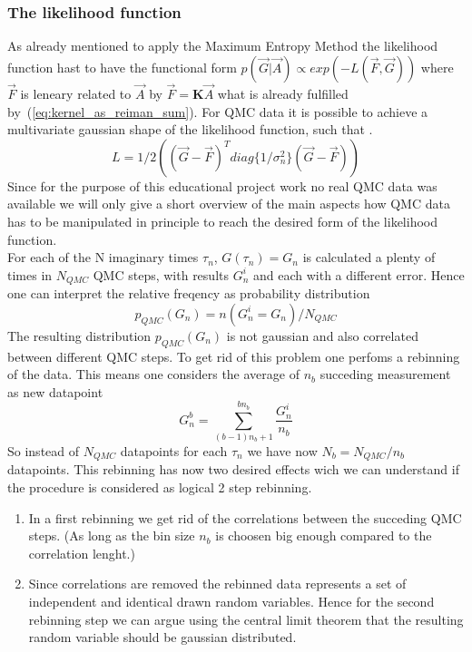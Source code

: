 \subsubsection{The likelihood function}

As already mentioned to apply the Maximum Entropy Method the likelihood function hast to have the functional form 
$ p(\vec{G}|\vec{A}) \propto exp(-L(\vec{F},\vec{G}))$ where $\vec{F}$ is leneary related to $\vec{A}$ by
$\vec{F} = \textbf{K} \vec{A}$ what is already fulfilled by~(\ref{eq:kernel_as_reiman_sum}). For QMC data it is 
possible to achieve a multivariate gaussian shape of the likelihood function, such that .
\begin{equation}
	L = 1/2 ((\vec{G} - \vec{F})^T diag\{1/ \sigma_n^2 \} (\vec{G} - \vec{F}))
	\label{eq:L(G)}
\end{equation}
Since for the purpose of this educational project work no real QMC data was available we will only give a short overview of
the main aspects how QMC data has to be manipulated in principle to reach the desired form of the likelihood function.\\
For each of the N imaginary times $\tau_n$, $G(\tau_n) = G_n$ is calculated a plenty of times in $N_{QMC}$ QMC steps, with results $G_n^i$ and each with a different error. 
Hence one can interpret the relative freqency as probability distribution \[ p_{QMC}(G_n)= n(G_n^i = G_n)/N_{QMC} \]
The resulting distribution $p_{QMC}(G_n)$ is not gaussian and also correlated between different QMC steps. To get rid
of this problem one perfoms a rebinning of the data. This means one considers the average of $n_b$ succeding measurement as new 
datapoint \[G_n^b = \sum_{(b-1) n_b + 1}^{b n_b} \frac{G_n^i}{n_b} \] 
\noindent So instead of $N_{QMC}$ datapoints for each $\tau_n$
we have now $N_b = N_{QMC}/n_b$ datapoints. This rebinning has now two desired effects wich we can understand if the
procedure is considered as logical 2 step rebinning. 
\begin{enumerate}
\item In a first rebinning we get rid of the correlations between the succeding QMC steps. (As long as the bin size $n_b$
 is choosen big enough compared to the correlation lenght.)
\item Since correlations are removed the rebinned data represents a set of independent and identical drawn random variables.
Hence for the second rebinning step we can argue using the central limit theorem that the resulting random variable should
be gaussian distributed.
\end{enumerate}

